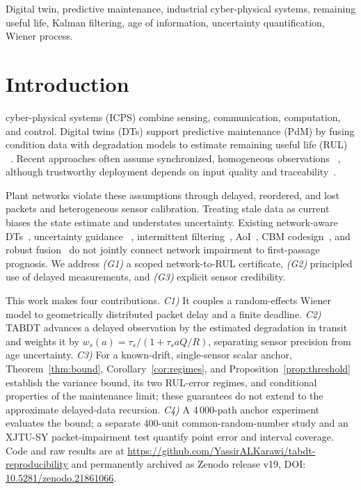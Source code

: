 \documentclass[journal]{IEEEtran}
\begin{document}
\begin{IEEEkeywords}
Digital twin, predictive maintenance, industrial cyber-physical systems,
remaining useful life, Kalman filtering, age of information, uncertainty
quantification, Wiener process.
\end{IEEEkeywords}

\IEEEpeerreviewmaketitle

\section{Introduction}
 cyber-physical systems (ICPS) combine sensing,
communication, computation, and control. Digital twins (DTs) support
predictive maintenance (PdM) by fusing condition data with degradation models
to estimate remaining useful life (RUL)
~\cite{liu2024ticps,zhang2024ticps,tao2019}. Recent approaches often assume
synchronized, homogeneous observations
~\cite{samanazari2024ticps,kumar2025ticps}, although trustworthy deployment
depends on input quality and traceability~\cite{zhang2024ticps}.

Plant networks violate these assumptions through delayed, reordered, and lost
packets and heterogeneous sensor calibration. Treating stale data as current
biases the state estimate and understates uncertainty. Existing network-aware
DTs~\cite{alkarawi2026dt}, uncertainty guidance
~\cite{nist2023,ding2024tim}, intermittent filtering~\cite{sinopoli2004},
AoI~\cite{yates2021}, CBM codesign~\cite{ahmad2023jiot}, and robust
fusion~\cite{yang2022jiot} do not jointly connect network impairment to
first-passage prognosis. We address \emph{(G1)} a scoped network-to-RUL
certificate, \emph{(G2)} principled use of delayed measurements, and
\emph{(G3)} explicit sensor credibility.

This work makes four contributions. \emph{C1)} It couples a random-effects
Wiener model to geometrically distributed packet delay and a finite deadline.
\emph{C2)} TABDT
advances a delayed observation by the estimated degradation in transit and
weights it by $w_s(a)=\tau_s/(1+\tau_s aQ/R)$, separating sensor precision
from age uncertainty. \emph{C3)} For a known-drift, single-sensor scalar anchor,
Theorem~\ref{thm:bound}, Corollary~\ref{cor:regimes}, and
Proposition~\ref{prop:threshold} establish the variance bound, its two
RUL-error regimes, and conditional properties of the maintenance limit; these
guarantees do not extend to the approximate delayed-data recursion. \emph{C4)}
A 4\,000-path anchor experiment evaluates the bound; a separate 400-unit
common-random-number study and an XJTU-SY packet-impairment test quantify
point error and interval coverage. Code and raw results are at
\url{https://github.com/YassirALKarawi/tabdt-reproducibility} and permanently
archived as Zenodo release v19, DOI:
\href{https://doi.org/10.5281/zenodo.21861066}{10.5281/zenodo.21861066}.
\end{document}
